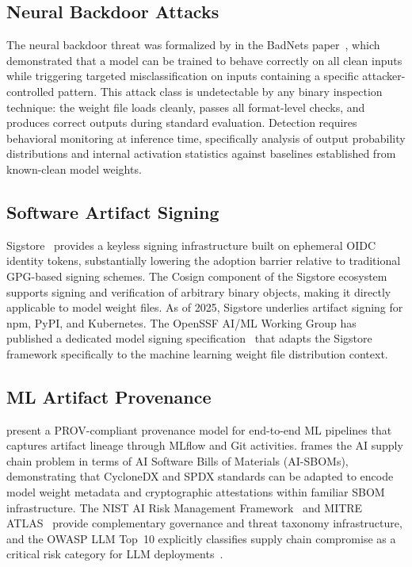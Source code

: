 \documentclass[preprint,12pt,twocolumn]{elsarticle}
\begin{document}
\subsection{Neural Backdoor Attacks}

The neural backdoor threat was formalized by \citeauthor{gu2019badnets}
in the BadNets paper~\citep{gu2019badnets}, which demonstrated that a
model can be trained to behave correctly on all clean inputs while
triggering targeted misclassification on inputs containing a specific
attacker-controlled pattern. This attack class is undetectable by any
binary inspection technique: the weight file loads cleanly, passes all
format-level checks, and produces correct outputs during standard
evaluation. Detection requires behavioral monitoring at inference time,
specifically analysis of output probability distributions and internal
activation statistics against baselines established from known-clean
model weights.

\subsection{Software Artifact Signing}

Sigstore~\citep{newman2022sigstore} provides a keyless signing
infrastructure built on ephemeral OIDC identity tokens, substantially
lowering the adoption barrier relative to traditional GPG-based signing
schemes. The Cosign component of the Sigstore ecosystem supports signing
and verification of arbitrary binary objects, making it directly applicable
to model weight files. As of 2025, Sigstore underlies artifact signing
for npm, PyPI, and Kubernetes. The OpenSSF AI/ML Working Group has
published a dedicated model signing specification~\citep{openssf_modelsigning2025}
that adapts the Sigstore framework specifically to the machine learning
weight file distribution context.

\subsection{ML Artifact Provenance}

\citet{schlegel2024provenance} present a PROV-compliant provenance model
for end-to-end ML pipelines that captures artifact lineage through MLflow
and Git activities. \citet{gentyala2026aisbom} frames the AI supply chain
problem in terms of AI Software Bills of Materials (AI-SBOMs), demonstrating
that CycloneDX and SPDX standards can be adapted to encode model weight
metadata and cryptographic attestations within familiar SBOM infrastructure.
The NIST AI Risk Management Framework~\citep{nist_ai_rmf2023} and MITRE
ATLAS~\citep{mitre_atlas2023} provide complementary governance and threat
taxonomy infrastructure, and the OWASP LLM Top~10 explicitly classifies
supply chain compromise as a critical risk category for LLM
deployments~\citep{owasp_llm_supply2025}.
\end{document}
